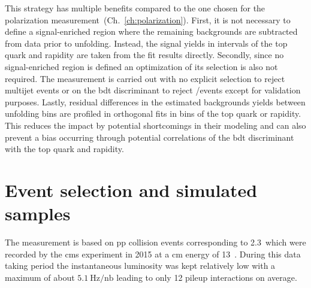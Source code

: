 This strategy has multiple benefits compared to the one chosen for the polarization measurement~(Ch.~\ref{ch:polarization}). First, it is not necessary to define a signal-enriched region where the remaining backgrounds are subtracted from data prior to unfolding. Instead, the signal yields in intervals of the top quark \pt and rapidity are taken from the fit results directly. Secondly, since no signal-enriched region is defined an optimization of its selection is also not required. The measurement is carried out with no explicit selection to reject multijet events or on the \gls{bdt} discriminant to reject \wjets/\ttbar events except for validation purposes. Lastly, residual differences in the estimated backgrounds yields between unfolding bins are profiled in orthogonal fits in bins of the top quark \pt or rapidity. This reduces the impact by potential shortcomings in their modeling and can also prevent a bias occurring through potential correlations of the \gls{bdt} discriminant with the top quark \pt and rapidity.



\section{Event selection and simulated samples}

The measurement is based on \gls{pp} collision events corresponding to 2.3~\invfb which were recorded by the \gls{cms} experiment in 2015 at a \acrlong{cm} energy of 13~\TeV. During this data taking period the instantaneous luminosity was kept relatively low with a maximum of about $5.1~\mathrm{Hz}/\mathrm{nb}$ leading to only 12 pileup interactions on average. 

